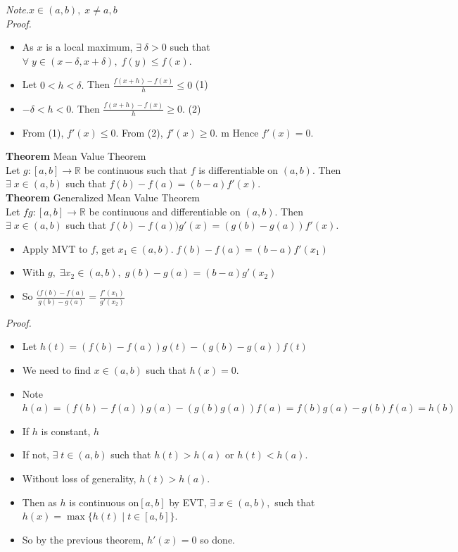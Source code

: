 \documentclass[12pt]{article}
\begin{document}
{\sl Note.}$x\in (a,b),\; x\neq a,b$\\

{\sl Proof.}
\begin{itemize}
  \item As $x$ is a local maximum, $\exists\;\delta>0$ such that $\forall\;y\in(x-\delta,x+\delta),\; f(y)\le f(x)$.
  \item Let $0<h<\delta.$ Then $\frac{f(x+h)-f(x)}{h}\le 0$ \hfill (1)
  \item $-\delta<h<0$. Then $\frac{f(x+h)-f(x)}{h}\ge 0$. \hfill (2)
  \item From (1), $f'(x)\le 0$. From (2), $f'(x)\ge 0$.
  \mite m Hence $f'(x) = 0$.
\end{itemize}

\vspace{1\baselineskip}
{\bf Theorem} Mean Value Theorem\\
Let $g\colon [a,b]\to\mathbb{R}$ be continuous such that $f$ is differentiable on $(a,b)$. Then $\exists\;x\in(a,b)$ such that $f(b)-f(a) = (b-a)f'(x).$\\ 

{\bf Theorem} Generalized Mean Value Theorem\\
Let $fg\colon [a,b]\to\mathbb{R}$ be continuous and differentiable on $(a,b)$. Then $\exists\; x\in(a,b)$ such that $f(b)-f(a))g'(x)=(g(b)-g(a))f'(x).$\\

\begin{itemize}
    \item Apply MVT to $f$, get $x_1\in (a,b). \; f(b)-f(a)=(b-a)f'(x_1)$ 
    \item With $g,\; \exists x_2\in(a,b),\; g(b)-g(a)=(b-a)g'(x_2)$\\
    \item So $\frac{(f(b)-f(a)}{g(b)-g(a)} = \frac{f'(x_1)}{g'(x_2)}$
\end{itemize}

{\sl Proof.} 

\begin{itemize}
    \item Let $h(t) = (f(b)-f(a))g(t)-(g(b)-g(a))f(t)$
    \item We need to find $x\in(a,b)$ such that $h(x)=0$.
    \item Note $h(a)=(f(b)-f(a))g(a)-(g(b)g(a))f(a) = f(b)g(a)-g(b)f(a)=h(b)$
    \item If $h$ is constant, $h$

    
   \item If not, $\exists\;t\in(a,b)$ such that $h(t)>h(a)$ or $h(t)<h(a)$.
    \item Without loss of generality, $h(t)>h(a)$.
    \item Then as $h$ is continuous on$[a,b]$ by EVT, $\exists\;x\in(a,b),$ such that $h(x)=\max\{h(t)\;|\; t\in[a,b]\}$.
    \item So by the previous theorem, $h'(x)=0$ so done.
\end{itemize}
\end{document}
